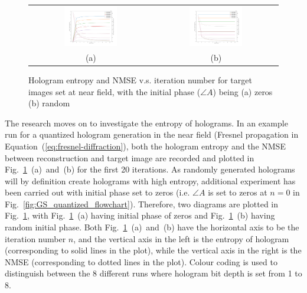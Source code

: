 	\begin{figure} [ht]
		\begin{center}
			\begin{tabular}{c c}
				\includegraphics[trim={90 50 60 80}, clip, width = 0.45\textwidth]{GS_Fresnel0.1_iterations_zero_start.png} &
				\includegraphics[trim={90 50 60 80}, clip, width = 0.45\textwidth]{GS_Fresnel0.1_iterations_random_start.png} \\
				(a) & (b)
			\end{tabular}
			\caption{\label{fig:GS_Fresnel0.1_iterations} Hologram entropy and NMSE v.s. iteration number for target images set at near field, with the initial phase ($\angle A$) being (a) zeros (b) random}
		\end{center}
	\end{figure}
	
	The research moves on to investigate the entropy of holograms. In an example run for a quantized hologram generation in the near field (Fresnel propagation in Equation~(\ref{eq:fresnel-diffraction}), both the hologram entropy and the NMSE between reconstruction and target image are recorded and plotted in Fig.~\ref{fig:GS_Fresnel0.1_iterations}~(a)~and~(b) for the first 20 iterations. As randomly generated holograms will by definition create holograms with high entropy, additional experiment has been carried out with initial phase set to zeros (i.e. $\angle A$ is set to zeros at $n=0$ in Fig.~\ref{fig:GS_quantized_flowchart}). Therefore, two diagrams are plotted in Fig.~\ref{fig:GS_Fresnel0.1_iterations}, with Fig.~\ref{fig:GS_Fresnel0.1_iterations}~(a) having initial phase of zeros and Fig.~\ref{fig:GS_Fresnel0.1_iterations}~(b) having random initial phase. Both Fig.~\ref{fig:GS_Fresnel0.1_iterations}~(a)~and~(b) have the horizontal axis to be the iteration number $n$, and the vertical axis in the left is the entropy of hologram (corresponding to solid lines in the plot), while the vertical axis in the right is the NMSE (corresponding to dotted lines in the plot). Colour coding is used to distinguish between the 8 different runs where hologram bit depth is set from 1 to 8.
	
